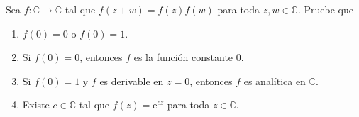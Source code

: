 \documentclass[../main.tex]{subfiles}
\begin{document}
\begin{problema}
    Sea \(f \colon \mathbb{C} \to \mathbb{C}\) tal que \(f(z + w) = f(z)f(w)\) para
    toda \(z,w\in \mathbb{C}\). Pruebe que

    \begin{enumerate}
        \item \(f(0) = 0\) o \(f(0) = 1\).
        \item Si \(f(0) = 0\), entonces \(f\) es la función constante 0.
        \item Si \(f(0) = 1\) y \(f\) es derivable en \(z = 0\), entonces \(f\) es
            analítica en \(\mathbb{C}\).
        \item Existe \(c\in \mathbb{C}\) tal que \(f(z) = \mathrm{e}^{cz}\) para toda
            \(z\in \mathbb{C}\).
    \end{enumerate}
\end{problema}
\end{document}
